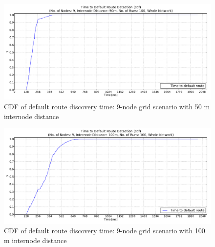\begin{figure}[htpb]
  \begin{center}
   \vspace{-20pt}
    \leavevmode
      \includegraphics[scale=0.38]
      {Pics/results/9/MRHOF/grid/dist50_montecarlo_cdf_hist.pdf}
   \caption{CDF of default route discovery time: 9-node grid scenario with 50 m internode distance}
   \label{fig:9_MRHOF_grid_50_cdf}
  \end{center}
\end{figure}

\begin{figure}[htpb]
  \begin{center}
   \vspace{-20pt}
    \leavevmode
      \includegraphics[scale=0.38]
      {Pics/results/9/MRHOF/grid/dist100_montecarlo_cdf_hist.pdf}
   \caption{CDF of default route discovery time: 9-node grid scenario with 100 m internode distance}
   \label{fig:9_MRHOF_grid_100_cdf}
  \end{center}
\end{figure}


